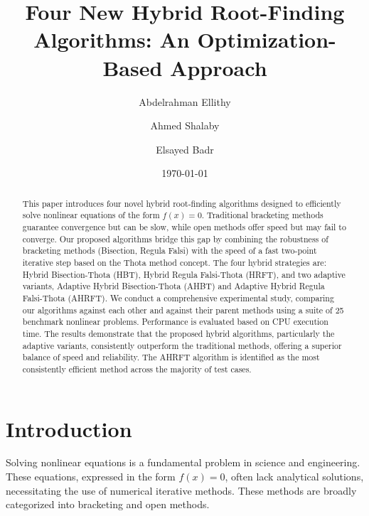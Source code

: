 \documentclass[reprint, amsmath, amssymb, aps, prl]{revtex4-2}
\begin{document}

\title{Four New Hybrid Root-Finding Algorithms: An Optimization-Based Approach}

\author{Abdelrahman Ellithy}

\author{Ahmed Shalaby}

\author{Elsayed Badr}

\date{\today}

\begin{abstract}
This paper introduces four novel hybrid root-finding algorithms designed to efficiently solve nonlinear equations of the form $f(x) = 0$. Traditional bracketing methods guarantee convergence but can be slow, while open methods offer speed but may fail to converge. Our proposed algorithms bridge this gap by combining the robustness of bracketing methods (Bisection, Regula Falsi) with the speed of a fast two-point iterative step based on the Thota method concept. The four hybrid strategies are: Hybrid Bisection-Thota (HBT), Hybrid Regula Falsi-Thota (HRFT), and two adaptive variants, Adaptive Hybrid Bisection-Thota (AHBT) and Adaptive Hybrid Regula Falsi-Thota (AHRFT). We conduct a comprehensive experimental study, comparing our algorithms against each other and against their parent methods using a suite of 25 benchmark nonlinear problems. Performance is evaluated based on CPU execution time. The results demonstrate that the proposed hybrid algorithms, particularly the adaptive variants, consistently outperform the traditional methods, offering a superior balance of speed and reliability. The AHRFT algorithm is identified as the most consistently efficient method across the majority of test cases.
\end{abstract}

\maketitle

\section{Introduction}
Solving nonlinear equations is a fundamental problem in science and engineering. These equations, expressed in the form $f(x) = 0$, often lack analytical solutions, necessitating the use of numerical iterative methods. These methods are broadly categorized into bracketing and open methods.
\end{document}
